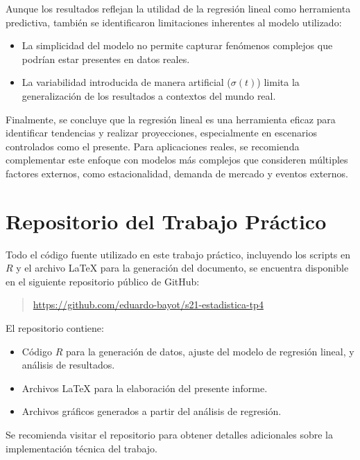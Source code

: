 \documentclass[a4paper,12pt]{article}
\begin{document}
Aunque los resultados reflejan la utilidad de la regresión lineal como herramienta predictiva, también se identificaron limitaciones inherentes al modelo utilizado:
\begin{itemize}
    \item La simplicidad del modelo no permite capturar fenómenos complejos que podrían estar presentes en datos reales.
    \item La variabilidad introducida de manera artificial (\( \sigma(t) \)) limita la generalización de los resultados a contextos del mundo real.
\end{itemize}

Finalmente, se concluye que la regresión lineal es una herramienta eficaz para identificar tendencias y realizar proyecciones, especialmente en escenarios controlados como el presente. Para aplicaciones reales, se recomienda complementar este enfoque con modelos más complejos que consideren múltiples factores externos, como estacionalidad, demanda de mercado y eventos externos.


\printbibliography

\appendix

\section{Repositorio del Trabajo Práctico}

Todo el código fuente utilizado en este trabajo práctico, incluyendo los scripts en \( R \) y el archivo LaTeX para la generación del documento, se encuentra disponible en el siguiente repositorio público de GitHub:

\begin{quote}
\url{https://github.com/eduardo-bayot/s21-estadistica-tp4}
\end{quote}

El repositorio contiene:
\begin{itemize}
    \item Código \( R \) para la generación de datos, ajuste del modelo de regresión lineal, y análisis de resultados.
    \item Archivos LaTeX para la elaboración del presente informe.
    \item Archivos gráficos generados a partir del análisis de regresión.
\end{itemize}

Se recomienda visitar el repositorio para obtener detalles adicionales sobre la implementación técnica del trabajo.
\end{document}
